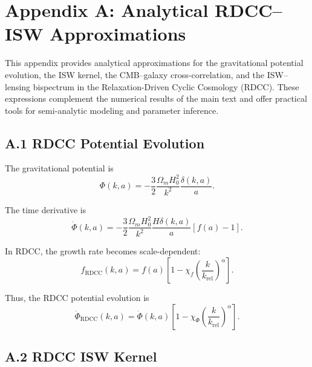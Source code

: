 \documentclass[11pt,a4paper]{article}
\begin{document}
\section*{Appendix A: Analytical RDCC–ISW Approximations}

This appendix provides analytical approximations for the gravitational potential evolution, 
the ISW kernel, the CMB–galaxy cross-correlation, and the ISW–lensing bispectrum in the 
Relaxation-Driven Cyclic Cosmology (RDCC). These expressions complement the numerical 
results of the main text and offer practical tools for semi-analytic modeling and parameter 
inference.

\subsection*{A.1 RDCC Potential Evolution}

The gravitational potential is
\begin{equation}
    \Phi(k,a)
    = -\frac{3}{2}\frac{\Omega_{m}H_{0}^{2}}{k^{2}}
      \frac{\delta(k,a)}{a}.
\end{equation}

The time derivative is
\begin{equation}
    \dot{\Phi}(k,a)
    = -\frac{3}{2}\frac{\Omega_{m}H_{0}^{2}}{k^{2}}
      \frac{H\delta(k,a)}{a}
      \left[f(a)-1\right].
\end{equation}

In RDCC, the growth rate becomes scale-dependent:
\begin{equation}
    f_{\mathrm{RDCC}}(k,a)
    = f(a)
      \left[
        1 - \chi_{f}
        \left(\frac{k}{k_{\mathrm{rel}}}\right)^{\alpha}
      \right].
\end{equation}

Thus, the RDCC potential evolution is
\begin{equation}
    \dot{\Phi}_{\mathrm{RDCC}}(k,a)
    = \dot{\Phi}(k,a)
      \left[
        1 - \chi_{\Phi}
        \left(\frac{k}{k_{\mathrm{rel}}}\right)^{\alpha}
      \right].
\end{equation}

\subsection*{A.2 RDCC ISW Kernel}
\end{document}
